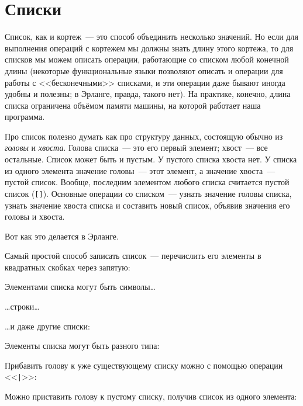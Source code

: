 \documentclass[
  paper=a4,
  fontsize=14pt,
  openany,
  appendixprefix=true
]{scrbook}
\begin{document}
\section{Списки}
\label{lists}

Список, как и кортеж~--- это способ объединить несколько значений. Но если для выполнения операций с кортежем мы должны знать длину этого кортежа, то для списков мы можем описать операции, работающие со списком любой конечной длины (некоторые функциональные языки позволяют описать и операции для работы с <<бесконечными>> списками, и эти операции даже бывают иногда удобны и полезны; в Эрланге, правда, такого нет). На практике, конечно, длина списка ограничена объёмом памяти машины, на которой работает наша программа.


Про список полезно думать как про структуру данных, состоящую обычно из {\em головы} и {\em хвоста}. Голова списка~--- это его первый элемент; хвост~--- все остальные. Список может быть и пустым. У пустого списка хвоста нет. У списка из одного элемента значение головы~--- этот элемент, а значение хвоста~--- пустой список. Вообще, последним элементом любого списка считается пустой список (\lstinline![]!). Основные операции со списком~--- узнать значение головы списка, узнать значение хвоста списка и составить новый список, объявив значения его головы и хвоста.

Вот как это делается в Эрланге.

Самый простой способ записать список~--- перечислить его элементы в квадратных скобках через запятую:

Элементами списка могут быть символы\ldots{}

\ldots{}строки\ldots{}

\ldots{}и даже другие списки:

Элементы списка могут быть разного типа:

Прибавить голову к уже существующему списку можно с помощью операции <<\lstinline{|}>>:

Можно приставить голову к пустому списку, получив список из одного элемента:
\end{document}
